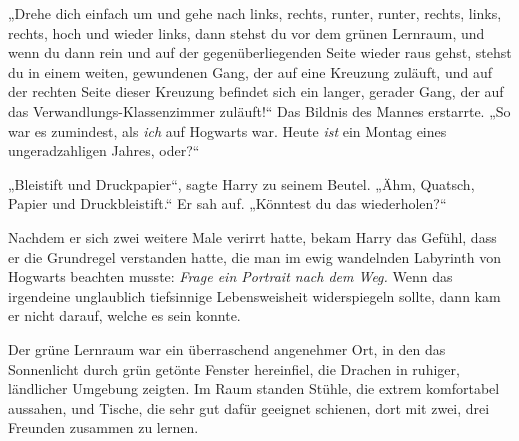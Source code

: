 „Drehe dich einfach um und gehe nach links, rechts, runter, runter, rechts, links, rechts, hoch und wieder links, dann stehst du vor dem grünen Lernraum, und wenn du dann rein und auf der gegenüberliegenden Seite wieder raus gehst, stehst du in einem weiten, gewundenen Gang, der auf eine Kreuzung zuläuft, und auf der rechten Seite dieser Kreuzung befindet sich ein langer, gerader Gang, der auf das Verwandlungs-Klassenzimmer zuläuft!“ Das Bildnis des Mannes erstarrte. „So war es zumindest, als \emph{ich} auf Hogwarts war. Heute \emph{ist} ein Montag eines ungeradzahligen Jahres, oder?“%

„Bleistift und Druckpapier“, sagte Harry zu seinem Beutel. „Ähm, Quatsch, Papier und Druckbleistift.“ Er sah auf. „Könntest du das wiederholen?“

Nachdem er sich zwei weitere Male verirrt hatte, bekam Harry das Gefühl, dass er die Grundregel verstanden hatte, die man im ewig wandelnden Labyrinth von Hogwarts beachten musste: \emph{Frage ein Portrait nach dem Weg.} Wenn das irgendeine unglaublich tiefsinnige Lebensweisheit widerspiegeln sollte, dann kam er nicht darauf, welche es sein konnte.

Der grüne Lernraum war ein überraschend angenehmer Ort, in den das Sonnenlicht durch grün getönte Fenster hereinfiel, die Drachen in ruhiger, ländlicher Umgebung zeigten. Im Raum standen Stühle, die extrem komfortabel aussahen, und Tische, die sehr gut dafür geeignet schienen, dort mit zwei, drei Freunden zusammen zu lernen.


